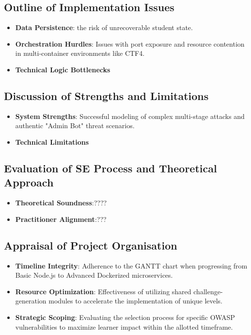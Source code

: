 \subsection{Outline of Implementation Issues}
\begin{itemize}
\item \textbf{Data Persistence}: the risk of unrecoverable student state.
\item \textbf{Orchestration Hurdles}: Issues with port exposure and resource contention in multi-container environments like CTF4.
\item \textbf{Technical Logic Bottlenecks}
\end{itemize}

\subsection{Discussion of Strengths and Limitations}
\begin{itemize}
\item \textbf{System Strengths}: Successful modeling of complex multi-stage attacks and authentic "Admin Bot" threat scenarios.
\item \textbf{Technical Limitations}
\end{itemize}

\subsection{Evaluation of SE Process and Theoretical Approach}
\begin{itemize}
\item \textbf{Theoretical Soundness}:????
\item \textbf{Practitioner Alignment}:???
\end{itemize}

\subsection{Appraisal of Project Organisation}
\begin{itemize}
\item \textbf{Timeline Integrity}: Adherence to the GANTT chart when progressing from Basic Node.js to Advanced Dockerized microservices.
\item \textbf{Resource Optimization}: Effectiveness of utilizing shared challenge-generation modules to accelerate the implementation of unique levels.
\item \textbf{Strategic Scoping}: Evaluating the selection process for specific OWASP vulnerabilities to maximize learner impact within the allotted timeframe.
\end{itemize}